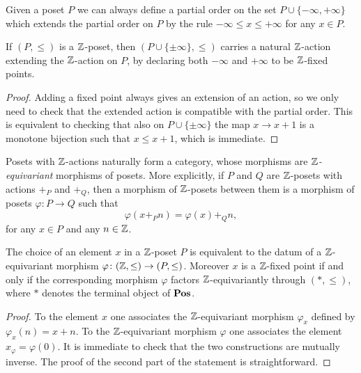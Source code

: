 \begin{remark}
 Given a poset $P$ we can always define a partial order on the set $P\cup\{-\infty,+\infty\}$ which extends the partial order on $P$ by the rule $-\infty\leq x\leq +\infty$ for any $x\in P$. 
\end{remark}
\begin{lemma}
 If $(P,\leq)$ is a $\mathbb{Z} $\hyp{}poset, then $(P\cup\{\pm\infty\},\leq)$ carries a natural $\mathbb{Z} $\hyp{}action extending the $\mathbb{Z} $\hyp{}action on $P$, by declaring both $-\infty$ and $+\infty$ to be $\mathbb{Z} $\hyp{}fixed points.
\end{lemma}
\begin{proof}
 Adding a fixed point always gives an extension of an action, so we only need to check that the extended action is compatible with the partial order. This is equivalent to checking that also on $P\cup\{\pm\infty\}$ the map $x\to x+1$ is a monotone bijection such that $x\leq x+1$, which is immediate. 
\end{proof}
Posets with $\mathbb{Z} $\hyp{}actions naturally form a category, whose morphisms are \emph{$\mathbb{Z} $\hyp{}equivariant} morphisms of posets. More explicitly, if $P$ and $Q$ are $\mathbb{Z} $\hyp{}posets with actions $+_P$ and $+_Q$, then a morphism of $\mathbb{Z} $\hyp{}posets between them is a morphism of posets $\varphi\colon P\to Q$ such that
\[
\varphi(x+_P n)=\varphi(x)+_Q n,
\]
for any $x\in P$ and any $n\in \mathbb{Z} $.
\begin{lemma}\label{trivial.but.useful2}
The choice of an element $x$ in a $\mathbb{Z} $\hyp{}poset $P$ is equivalent to the datum of a $\mathbb{Z} $\hyp{}equivariant morphism $\varphi\colon(\mathbb{Z} ,\leq)\to (P,\leq)$. Moreover $x$ is a $\mathbb{Z} $\hyp{}fixed point if and only if the corresponding morphism $\varphi$ factors $\mathbb{Z} $\hyp{}equivariantly through $(*,\leq)$, where $*$ denotes the terminal object of $\textbf{Pos}$. 
 \end{lemma}
\begin{proof}
To the element $x$ one associates the $\mathbb{Z} $\hyp{}equivariant morphism $\varphi_x$ defined by $\varphi_x(n)=x+n$. To the $\mathbb{Z} $\hyp{}equivariant morphism $\varphi$ one associates the element $x_\varphi=\varphi(0)$. It is immediate to check that the two constructions are mutually inverse. The proof of the second part of the statement is straightforward.
\end{proof}
